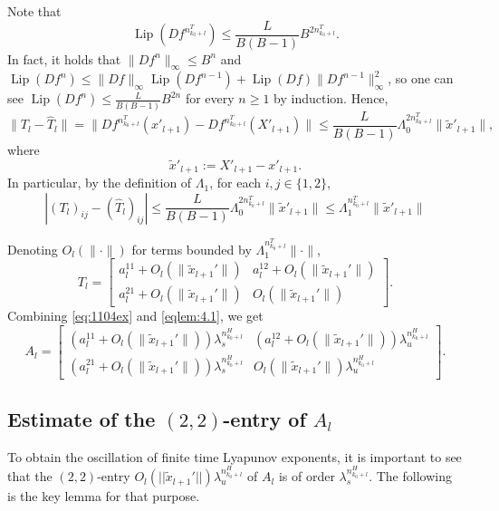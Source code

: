 \documentclass{amsart}
\theoremstyle{plain}
\theoremstyle{definition}
\theoremstyle{remark}
\numberwithin{equation}{section}
\begin{document}
Note that
\[
\operatorname{Lip}(Df^{n_{k_0+l}^T})\le \frac{L}{B(B-1)} B^{2n_{k_0+l}^T}.
\]
In fact, it holds that $\|Df^n\|_\infty\le B^{n}$ and $\operatorname{Lip}(Df^{n})\le\|Df\|_\infty\operatorname{Lip}(Df^{n-1})+\operatorname{Lip}(Df)\|Df^{n-1}\|_\infty^2$,
so
one can see $\operatorname{Lip}(Df^n)\le \frac{L}{B(B-1)} B^{2n}$ for every $n\ge 1$ by induction.
Hence,
\[
\|T_l-\hat T_l\|
=
\|Df^{n_{k_0+l}^T}(x'_{l+1})-Df^{n_{k_0+l}^T}(X'_{l+1})\|
\le
\frac{L}{B(B-1)} \Lambda_0^{2n_{k_0+l}^T}\|\tilde x'_{l+1}\|,
\]
where
\[
\tilde x'_{l+1}:=X'_{l+1}-x'_{l+1}.
\]
In particular, by the definition of $\Lambda_1$, for each $i,j\in\{1,2\}$,
\[
|(T_l)_{ij}-(\hat T_l)_{ij}|
\le
\frac{L}{B(B-1)} \Lambda_0^{2n_{k_0+l}^T}\|\tilde x'_{l+1}\| \le \Lambda_1^{n_{k_0+l}^T}\|\tilde x'_{l+1}\|
\]




Denoting $O_l(\|\cdot\|)$ for terms bounded by
$\Lambda_1^{n_{k_0+l}^T}\|\cdot\|$,
\begin{equation}\label{eqlem:4.1}
    T_l=\begin{bmatrix}
        a_l^{11}+O_l(\|\tilde x_{l+1}'\|) & a_l^{12}+O_l(\|\tilde x_{l+1}'\|)\\
        a_l^{21}+O_l(\|\tilde x_{l+1}'\|) & O_l(\|\tilde x_{l+1}'\|)
    \end{bmatrix}.
\end{equation}
Combining \eqref{eq:1104ex} and \eqref{eqlem:4.1}, we get
\begin{equation}\label{eq:20250927a}
    A_l=\begin{bmatrix}
        (a_l^{11}+O_l(\|\tilde x_{l+1}'\|))\lambda_s^{n_{k_0+l}^H}
          & (a_l^{12}+O_l(\|\tilde x_{l+1}'\|))\lambda_u^{n_{k_0+l}^H}\\
        (a_l^{21}+O_l(\|\tilde x_{l+1}'\|))\lambda_s^{n_{k_0+l}^H}
          & O_l(\|\tilde x_{l+1}'\|)\lambda_u^{n_{k_0+l}^H}
    \end{bmatrix}.
\end{equation}

\subsection{Estimate of the $(2,2)$-entry of $A_l$}

To obtain the oscillation of finite time Lyapunov exponents, it is important to see that the $(2,2)$-entry $ O_l(||\tilde x_{l+1}'||) \lambda_{u}^{n_{k_0+l}^H}$ of $A_l$ is of order $\lambda_{s}^{n_{k_0+l}^H}$.
The following is the key lemma for that purpose.
\end{document}
